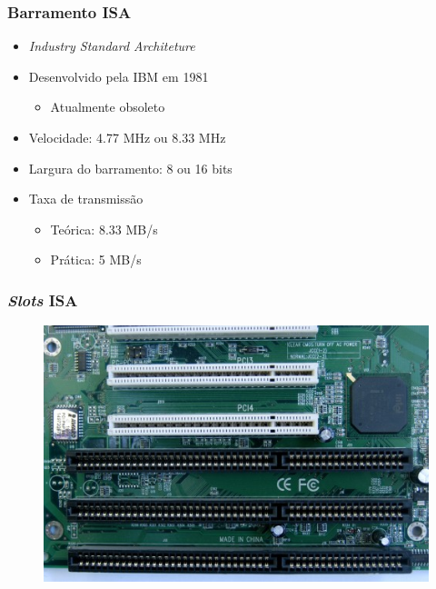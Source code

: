 \documentclass[aspectratio=169,
				xcolor=table]{beamer}
\begin{document}
	\begin{frame}
		\frametitle{Barramento ISA}
		\begin{itemize}
			\item \textit{Industry Standard Architeture}
			\vspace{.7em}
			\item Desenvolvido pela IBM em 1981
			\begin{itemize}
				\item Atualmente obsoleto
			\end{itemize}
			\vspace{.7em}
			\item Velocidade: 4.77 MHz ou 8.33 MHz
			\vspace{.7em}
			\item Largura do barramento: 8 ou 16 bits
			\vspace{.7em}
			\item Taxa de transmissão
			\begin{itemize}
				\item Teórica: 8.33 MB/s
				\item Prática: 5 MB/s
			\end{itemize}
		\end{itemize}
	\end{frame}
	
	\begin{frame}
		\frametitle{\textit{Slots} ISA}
		\begin{figure}[hbtp]
		\centering
		\includegraphics[height=.75\textheight]{../figs/cap11/isa.jpg}
		\end{figure}
	\end{frame}	
	
\end{document}
